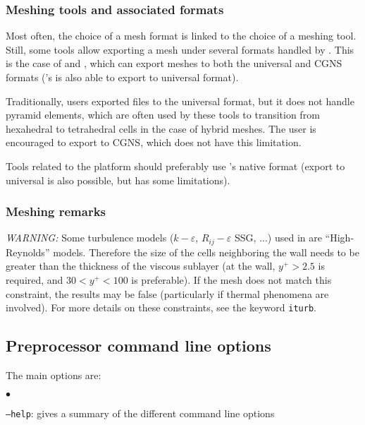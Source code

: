 {{{%
\subsubsection{Meshing tools and associated formats}

Most often, the choice of a mesh format is linked to the choice of
a meshing tool. Still, some tools allow exporting a mesh under several
formats handled by \CS. This is the case of \fluent and \icemcfd,
which can export meshes to both the \ideas universal and CGNS formats
(\fluent's \gambit is also able to export to \ideas universal format).

Traditionally, users exported files to the \ideas universal format,
but it does not handle pyramid elements, which are often used by these
tools to transition from hexahedral to tetrahedral cells in the case
of hybrid meshes. The user is encouraged to export to CGNS, which
does not have this limitation.

Tools related to the \salome platform should preferably use
\salome{}'s native \med format (export to \ideas universal is
also possible, but has some limitations).

\subsubsection{Meshing remarks}
\label{prg_maillages}%

{\em WARNING: }
Some turbulence models ($k-\varepsilon$, $R_{ij}-\varepsilon$ SSG, ...) used in
\CS are ``High-Reynolds'' models. Therefore the size of the cells
neighboring the wall needs to be greater than the thickness of the viscous
sublayer (at the wall, $y^+>2.5$ is required, and $30<y^+<100$ is
preferable). If the mesh does not match this constraint, the results may
be false (particularly if thermal phenomena are involved). For more details
on these constraints, see the keyword \texttt{iturb}.

\subsection{Preprocessor command line options}
\label{prg_optappelecs}%
The main options are:
\begin{list}{$\bullet$}{}
\item \texttt{--help}: gives a summary of the different command line options


\end{list}}}}
